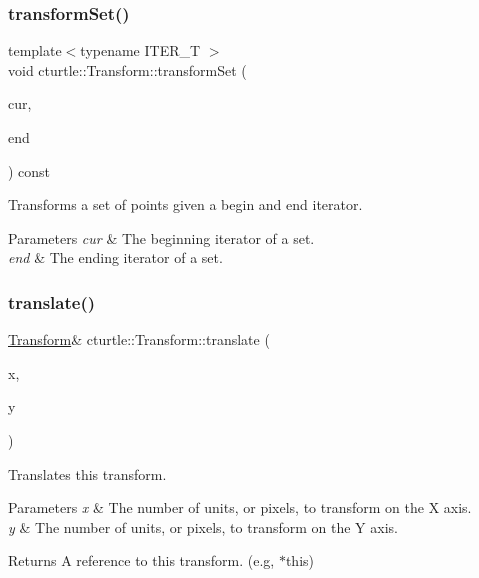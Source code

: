 \subsubsection{\texorpdfstring{transform\+Set()}{transformSet()}}
{\footnotesize\ttfamily template$<$typename I\+T\+E\+R\+\_\+T $>$ \\
void cturtle\+::\+Transform\+::transform\+Set (\begin{DoxyParamCaption}\item[{I\+T\+E\+R\+\_\+T}]{cur,  }\item[{I\+T\+E\+R\+\_\+T}]{end }\end{DoxyParamCaption}) const\hspace{0.3cm}{\ttfamily [inline]}}



Transforms a set of points given a begin and end iterator. 


\begin{DoxyParams}{Parameters}
{\em cur} & The beginning iterator of a set. \\
\hline
{\em end} & The ending iterator of a set. \\
\hline
\end{DoxyParams}
\mbox{\label{classcturtle_1_1Transform_ae5029e23d426ff809a48ab56316dd989}} 
\subsubsection{\texorpdfstring{translate()}{translate()}}
{\footnotesize\ttfamily \hyperlink{classcturtle_1_1Transform}{Transform}\& cturtle\+::\+Transform\+::translate (\begin{DoxyParamCaption}\item[{int}]{x,  }\item[{int}]{y }\end{DoxyParamCaption})\hspace{0.3cm}{\ttfamily [inline]}}



Translates this transform. 


\begin{DoxyParams}{Parameters}
{\em x} & The number of units, or pixels, to transform on the X axis. \\
\hline
{\em y} & The number of units, or pixels, to transform on the Y axis. \\
\hline
\end{DoxyParams}
\begin{DoxyReturn}{Returns}
A reference to this transform. (e.\+g, $\ast$this) 
\end{DoxyReturn}


